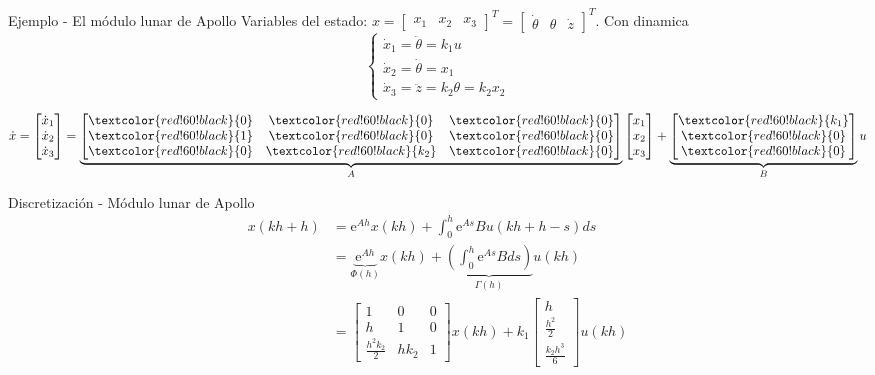 \documentclass[presentation,aspectratio=1610]{beamer}
\begin{document}
\begin{frame}[label={sec:orge040a0d}]{Ejemplo - El módulo lunar de Apollo}
Variables del estado: \(x = \begin{bmatrix} x_1 & x_2 & x_3 \end{bmatrix}^T = \begin{bmatrix} \dot{\theta} & \theta & \dot{z} \end{bmatrix}^T\). Con dinamica
\[ \begin{cases} \dot{x}_1 =  \ddot{\theta} = k_1 u\\ \dot{x}_2 = \dot{\theta} = x_1\\ \dot{x}_3 = \ddot{z} = k_2\theta = k_2x_2 \end{cases} \]

\[ \dot{x} = \begin{bmatrix} \dot{x}_1\\\dot{x}_2\\\dot{x}_3\end{bmatrix} = \underbrace{\begin{bmatrix} \textcolor{red!60!black}{0} & \textcolor{red!60!black}{0} &\textcolor{red!60!black}{0} \\\textcolor{red!60!black}{1} & \textcolor{red!60!black}{0}& \textcolor{red!60!black}{0}\\ \textcolor{red!60!black}{0}& \textcolor{red!60!black}{k_2} &\textcolor{red!60!black}{0} \end{bmatrix}}_{A} \begin{bmatrix} x_1\\x_2\\x_3\end{bmatrix} + \underbrace{\begin{bmatrix} \textcolor{red!60!black}{k_1} \\ \textcolor{red!60!black}{0} \\\textcolor{red!60!black}{0}  \end{bmatrix}}_{B} u \]
\end{frame}

\begin{frame}[label={sec:orgfd6070c}]{Discretización - Módulo lunar de Apollo}
 \begin{align*}
  x(kh+h) &= \mathrm{e}^{Ah} x(kh) + \int_{0}^{h} \mathrm{e}^{As} B u(kh+h-s) ds\\
   &= \underbrace{\mathrm{e}^{Ah}}_{\Phi(h)} x(kh) + \underbrace{\left(\int_{0}^h \mathrm{e}^{As} B ds \right)}_{\Gamma(h)} u(kh)\\
   &= \begin{bmatrix} 1 & 0 & 0\\h & 1 & 0\\\frac{h^2k_2}{2} & hk_2 & 1\end{bmatrix} x(kh) + k_1 \begin{bmatrix} h\\ \frac{h^2}{2} \\ \frac{k_2 h^3}{6} \end{bmatrix} u(kh)
\end{align*}
\end{frame}
\end{document}
